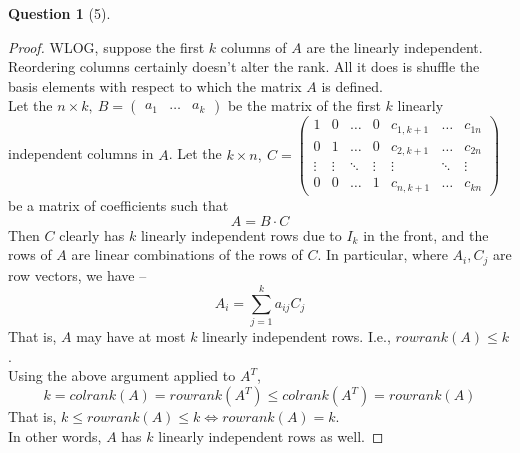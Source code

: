 \documentclass[11pt]{article}
\theoremstyle{quest}
\newtheorem*{question}{Question}
\begin{document}
\begin{question}[5]
\end{question}
\begin{proof}
WLOG, suppose the first $k$ columns of $A$ are the linearly independent. Reordering columns certainly doesn't alter the rank. All it does is shuffle the basis elements with respect to which the matrix $A$ is defined.
\\Let the $n \times k,\ B = \begin{pmatrix}
a_1 & \ldots & a_k
\end{pmatrix}$ be the matrix of the first $k$ linearly independent columns in $A$. Let the $k \times n,\ C = \begin{pmatrix}
1 & 0 & \ldots & 0 & c_{1,k+1} & \ldots & c_{1n} \\
0 & 1 & \ldots & 0 & c_{2,k+1} & \ldots & c_{2n} \\
\vdots & \vdots & \ddots & \vdots & \vdots & \ddots & \vdots \\
0 & 0 & \ldots & 1 & c_{n,k+1} & \ldots & c_{kn}
\end{pmatrix} $ be a matrix of coefficients such that
$$A = B \cdot C$$
Then $C$ clearly has $k$ linearly independent rows due to $I_k$ in the front, and the rows of $A$ are linear combinations of the rows of $C$. In particular, where $A_i, C_j$ are row vectors, we have --
$$A_i = \sum_{j=1}^k a_{ij} C_j$$
That is, $A$ may have at most $k$ linearly independent rows. I.e., $\textit{rowrank}(A) \le k$.
\\Using the above argument applied to $A^T$,
$$k=\textit{colrank}(A) = \textit{rowrank}(A^T) \le \textit{colrank}(A^T) = \textit{rowrank}(A)$$
That is, $k \le \textit{rowrank}(A) \le k \iff \textit{rowrank}(A) = k$.
\\In other words, $A$ has $k$ linearly independent rows as well.
\end{proof}
\end{document}
